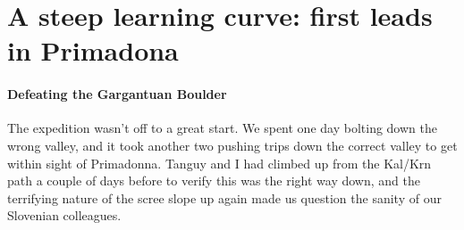 \section{A steep learning curve: first leads in Primadona}

\paragraph{Defeating the Gargantuan Boulder}
The expedition wasn’t off to a great start. We spent one day bolting down the wrong valley, and it took another two pushing trips down the correct valley to get within sight of Primadonna. Tanguy and I had climbed up from the Kal/Krn path a couple of days before to verify this was the right way down, and the terrifying nature of the scree slope up again made us question the sanity of our Slovenian colleagues.

